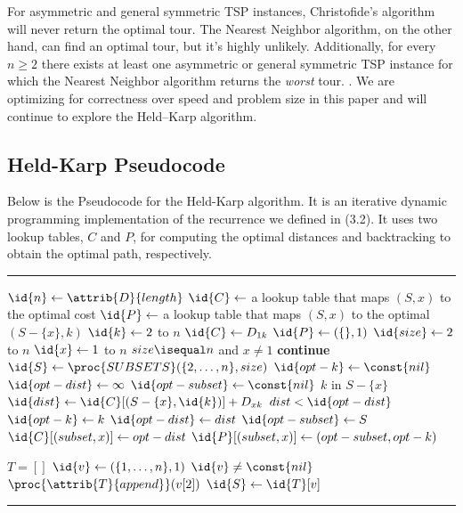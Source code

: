 \documentclass[11pt,fleqn]{article}
\begin{document}
For asymmetric and general symmetric TSP instances, Christofide's algorithm will
never return the optimal tour.  The Nearest Neighbor algorithm, on the other hand,
can find an optimal tour, but it's highly unlikely.  Additionally, for every $n \geq 2$
there exists at least one asymmetric or general symmetric TSP instance for which the
Nearest Neighbor algorithm returns the \textit{worst} tour. \cite{gutin}.  We are
optimizing for correctness over speed and problem size in this paper and will continue
to explore the Held--Karp algorithm.

\subsection{Held-Karp Pseudocode}
Below is the Pseudocode for the Held-Karp algorithm.  It is an iterative
dynamic programming implementation of the recurrence we defined in (3.2).
It uses two lookup tables, $C$ and $P$, for computing the optimal distances
and backtracking to obtain the optimal path, respectively.
\par

\vspace{.27cm}
\hrule
\begin{codebox}
\li $\id{n} \gets \attrib{D}{length}$
\li $\id{C} \gets$ a lookup table that maps $(S, x)$ to the optimal cost
\li $\id{P} \gets$ a lookup table that maps $(S, x)$ to the optimal $(S-\{x\}, k)$
\li
\li \For $\id{k} \gets 2$ to $n$
\li   \Do
	$\id{C} \gets D_{1k}$
\li     $\id{P} \gets (\{\}, 1)$
      \End
\li
\li \For $\id{size} \gets 2$ to $n$
\li   \Do
	\For $\id{x} \gets 1$ to $n$
\li	  \Do
	    \If $size \isequal n$ and $x \neq 1$
\li	      \Then
		\textbf{continue}
	      \End
\li	    \For $\id{S} \gets \proc{SUBSETS}(\{2,\dots,n\}, size)$
\li	      \Do
		$\id{opt-k} \gets \const{nil}$
\li		$\id{opt-dist} \gets \infty$
\li		$\id{opt-subset} \gets \const{nil}$
\li		\For $k$ in $S-\{x\}$
\li		  \Do
		    $\id{dist} \gets \id{C}[(S-\{x\}, \id{k})] + D_{xk}$
\li		    \If $dist < \id{opt-dist}$
\li		      \Then
			$\id{opt-k} \gets k$
\li			$\id{opt-dist} \gets dist$
\li			$\id{opt-subset} \gets S$
		      \End
		  \End
\li
\li		  $\id{C}[(subset, x)] \gets opt-dist$
\li		  $\id{P}[(subset, x)] \gets (opt-subset, opt-k)$
	      \End
	  \End
      \End

\li
\li $T = []$
\li $\id{v} \gets (\{1,\dots,n\}, 1)$
\li \While $\id{v} \neq \const{nil}$
\li   \Do
	$\proc{\attrib{T}{append}}(v[2])$
\li	$\id{S} \gets \id{T}[v]$
      \End	
\li
\li \Return {}
\end{codebox}
\vspace{.27cm}
\hrule
\end{document}
